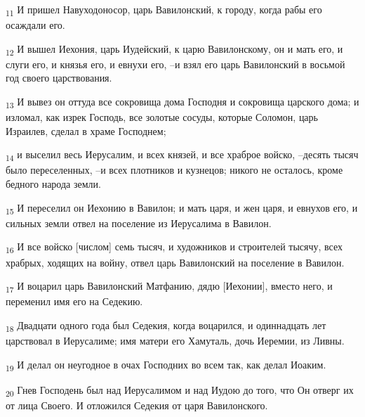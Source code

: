 \begin{tcolorbox}
\textsubscript{11} И пришел Навуходоносор, царь Вавилонский, к городу, когда рабы его осаждали его.
\end{tcolorbox}
\begin{tcolorbox}
\textsubscript{12} И вышел Иехония, царь Иудейский, к царю Вавилонскому, он и мать его, и слуги его, и князья его, и евнухи его, --и взял его царь Вавилонский в восьмой год своего царствования.
\end{tcolorbox}
\begin{tcolorbox}
\textsubscript{13} И вывез он оттуда все сокровища дома Господня и сокровища царского дома; и изломал, как изрек Господь, все золотые сосуды, которые Соломон, царь Израилев, сделал в храме Господнем;
\end{tcolorbox}
\begin{tcolorbox}
\textsubscript{14} и выселил весь Иерусалим, и всех князей, и все храброе войско, --десять тысяч было переселенных, --и всех плотников и кузнецов; никого не осталось, кроме бедного народа земли.
\end{tcolorbox}
\begin{tcolorbox}
\textsubscript{15} И переселил он Иехонию в Вавилон; и мать царя, и жен царя, и евнухов его, и сильных земли отвел на поселение из Иерусалима в Вавилон.
\end{tcolorbox}
\begin{tcolorbox}
\textsubscript{16} И все войско [числом] семь тысяч, и художников и строителей тысячу, всех храбрых, ходящих на войну, отвел царь Вавилонский на поселение в Вавилон.
\end{tcolorbox}
\begin{tcolorbox}
\textsubscript{17} И воцарил царь Вавилонский Матфанию, дядю [Иехонии], вместо него, и переменил имя его на Седекию.
\end{tcolorbox}
\begin{tcolorbox}
\textsubscript{18} Двадцати одного года был Седекия, когда воцарился, и одиннадцать лет царствовал в Иерусалиме; имя матери его Хамуталь, дочь Иеремии, из Ливны.
\end{tcolorbox}
\begin{tcolorbox}
\textsubscript{19} И делал он неугодное в очах Господних во всем так, как делал Иоаким.
\end{tcolorbox}
\begin{tcolorbox}
\textsubscript{20} Гнев Господень был над Иерусалимом и над Иудою до того, что Он отверг их от лица Своего. И отложился Седекия от царя Вавилонского.
\end{tcolorbox}
